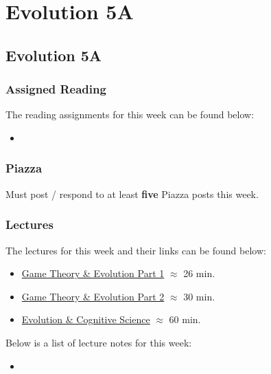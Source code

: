 \clearpage

\renewcommand{\ChapTitle}{Evolution 5A}
\renewcommand{\SectionTitle}{Evolution 5A}

\chapter{\ChapTitle}
\section{\SectionTitle}

\subsection{Assigned Reading}

The reading assignments for this week can be found below:

\begin{itemize}
    \item {}
\end{itemize}

\subsection{Piazza}

Must post / respond to at least \textbf{five} Piazza posts this week.

\subsection{Lectures}

The lectures for this week and their links can be found below:

\begin{itemize}
    \item \href{https://www.youtube.com/watch?v=fBDjfR1KCZA}{Game Theory \& Evolution Part 1} $\approx$ 26 min.
    \item \href{https://www.youtube.com/watch?v=b4yV21CZJFA}{Game Theory \& Evolution Part 2} $\approx$ 30 min.
    \item \href{https://www.youtube.com/watch?v=vbCVXcXF88I}{Evolution \& Cognitive Science} $\approx$ 60 min.
\end{itemize}

\noindent Below is a list of lecture notes for this week:

\begin{itemize}
    \item {}
\end{itemize}

